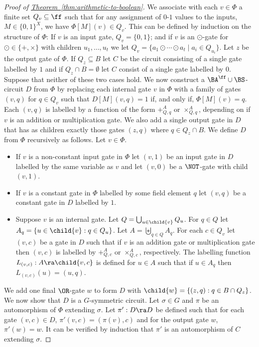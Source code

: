 \documentclass[11pt]{article}
\newcommand{\expref}[2]{\texorpdfstring{\hyperref[#2]{#1~\ref{#2}}}{#1~\ref{#2}}}
\begin{document}
\begin{proof}[Proof of \expref{Theorem}{thm:arithmetic-to-boolean}]
  We associate with each $v \in \Phi$ a finite set $Q_v \subseteq \ff$
  such that for any assignment of $0$-$1$ values to the inputs, $M \in
  \{0,1\}^X$, we have $\Phi[M](v) \in Q_v$.  This can be defined by
  induction on the structure of $\Phi$: If $v$ is an input gate, $Q_v
  = \{0,1\}$; and if $v$ is an $\odot$-gate for $\odot \in
  \{+,\times\}$ with children $u_1,\ldots,u_t$  we let $Q_v = \{
  a_1\odot \cdots \odot a_t \mid a_i \in Q_{u_i} \}$.
  Let $z$ be the output gate of $\Phi$. If $Q_z \subseteq B$ let $C$ be the
  circuit consisting of a single gate labelled by $1$ and if $Q_z \cap B =
  \emptyset$ let $C$ consist of a single gate labelled by $0$. Suppose that
  neither of these two cases hold.
  We now construct a $\BA^{\ff}\cup \BS$-circuit $D$ from $\Phi$ by replacing
  each internal gate $v$ in $\Phi$ with a family of gates $(v, q)$ for $q \in
  Q_v$ such that $D[M](v, q) = 1$ if, and only if, $\Phi[M](v) = q$. Each $(v,
  q)$ is labelled by a function of the form $+^A_{Q, q}$ or $\times^A_{Q, q}$,
  depending on if $v$ is an addition or multiplication gate. We also add a
  single output gate in $D$ that has as children exactly those gates $(z, q)$
  where $q \in Q_z \cap B$. We define $D$ from $\Phi$ recursively as follows.
  Let $v \in \Phi$.
  \begin{itemize}
  \item If $v$ is a non-constant input gate in $\Phi$ let $(v, 1)$ be an input
    gate in $D$ labelled by the same variable as $v$ and let $(v, 0)$ be a
    $\NOT$-gate with child $(v, 1)$.
  \item If $v$ is a constant gate in $\Phi$ labelled by some field element $q$
    let $(v, q)$ be a constant gate in $D$ labelled by $1$.
  \item Suppose $v$ is an internal gate. Let $Q = \bigcup_{u \in \child{v}}Q_u$.
    For $q \in Q$ let $A_q = \{u \in \child{v} : q \in Q_u\}$. Let $A =
    \biguplus_{q \in Q}A_q$. For each $c \in Q_v$ let $(v, c)$ be a gate in $D$
    such that if $v$ is an addition gate or multiplication gate then $(v, c)$ is
    labelled by $+^A_{Q, c}$ or $\times^A_{Q, c}$, respectively. The labelling
    function $L_{(v, c)} : A \ra \child{v, c}$ is defined for $u \in A$ such
    that if $u \in A_q$ then $L_{(v, c)} (u) = (u, q)$.
  \end{itemize}
  We add one final $\OR$-gate $w$ to form $D$ with $\child{w} = \{(z, q) : q \in
  B \cap Q_z\}$.
  We now show that $D$ is a $G$-symmetric circuit. Let $\sigma \in G$ and $\pi$
  be an automorphism of $\Phi$ extending $\sigma$. Let $\pi' : D \ra D$ be
  defined such that for each gate $(v, c) \in D$, $\pi' (v, c) = (\pi(v), c)$
  and for the output gate $w$, $\pi'(w) = w$. It can be verified by induction
  that $\pi'$ is an automorphism of $C$ extending $\sigma$.
  

\end{proof}
\end{document}
